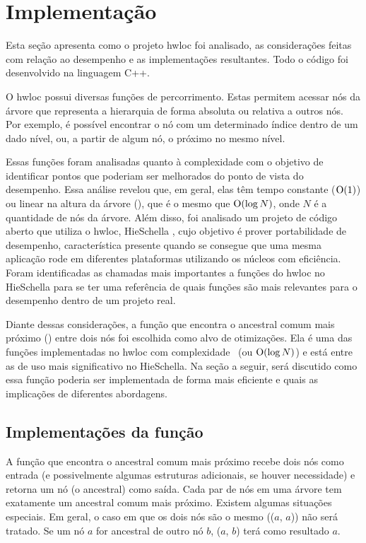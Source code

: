 \chapter{Implementação}

Esta seção apresenta como o projeto hwloc foi analisado, as considerações feitas com relação ao desempenho e as implementações resultantes.
Todo o código foi desenvolvido na linguagem C++.

O hwloc possui diversas funções de percorrimento.
Estas permitem acessar nós da árvore que representa a hierarquia de forma absoluta ou relativa a outros nós.
Por exemplo, é possível encontrar o nó com um determinado índice dentro de um dado nível,
ou, a partir de algum nó, o próximo no mesmo nível.

Essas funções foram analisadas quanto à complexidade com o objetivo de identificar pontos que poderiam ser melhorados do ponto de vista do desempenho.
Essa análise revelou que, em geral, elas têm tempo constante ($\operatorname{O}(1)$) ou linear na altura da árvore (\Oalt), que é o mesmo que $\operatorname{O}(\log N)$, onde $N$ é a quantidade de nós da árvore.
Além disso, foi analisado um projeto de código aberto que utiliza o hwloc, HieSchella \cite{HieSchella},
cujo objetivo é prover portabilidade de desempenho, característica presente quando se consegue que
uma mesma aplicação rode em diferentes plataformas utilizando os núcleos com eficiência.
Foram identificadas as chamadas mais importantes a funções do hwloc no HieSchella para se ter uma referência
de quais funções são mais relevantes para o desempenho dentro de um projeto real.

Diante dessas considerações, a função que encontra o ancestral comum mais próximo (\fACMP) entre dois nós foi escolhida como alvo de otimizações.
Ela é uma das funções implementadas no hwloc com complexidade \Oalt\ (ou $\operatorname{O}(\log N)$) e está entre as de uso mais significativo no HieSchella.
Na seção a seguir, será discutido como essa função poderia ser implementada de forma mais eficiente e quais as implicações de diferentes abordagens.


\section{Implementações da função \fACMP}

A função que encontra o ancestral comum mais próximo recebe dois nós como entrada (e possivelmente algumas estruturas adicionais, se houver necessidade)
e retorna um nó (o ancestral) como saída.
Cada par de nós em uma árvore tem exatamente um ancestral comum mais próximo.
Existem algumas situações especiais.
Em geral, o caso em que os dois nós são o mesmo (\fACMP($a$, $a$)) não será tratado.
Se um nó $a$ for ancestral de outro nó $b$, \fACMP($a$, $b$) terá como resultado $a$.

